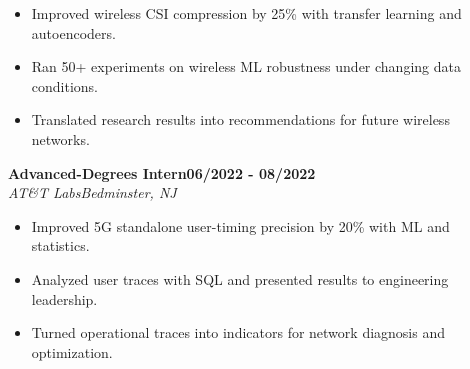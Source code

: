 \documentclass[8pt,letterpaper]{extarticle}
\newcommand{\role}[4]{%
  \Needspace{4\baselineskip}\textbf{#1}\hfill\textbf{#2}\\[-1pt]
  \textit{#3}\hfill\textit{#4}\par}
\begin{document}
\begin{itemize}
\item Improved wireless CSI compression by 25\% with transfer learning and autoencoders.
\item Ran 50+ experiments on wireless ML robustness under changing data conditions.
\item Translated research results into recommendations for future wireless networks.
\end{itemize}
\vspace{1pt}
\role{Advanced-Degrees Intern}{06/2022 - 08/2022}{AT\&T Labs}{Bedminster, NJ}
\begin{itemize}
\item Improved 5G standalone user-timing precision by 20\% with ML and statistics.
\item Analyzed user traces with SQL and presented results to engineering leadership.
\item Turned operational traces into indicators for network diagnosis and optimization.
\end{itemize}
\vspace{1pt}
\end{document}
